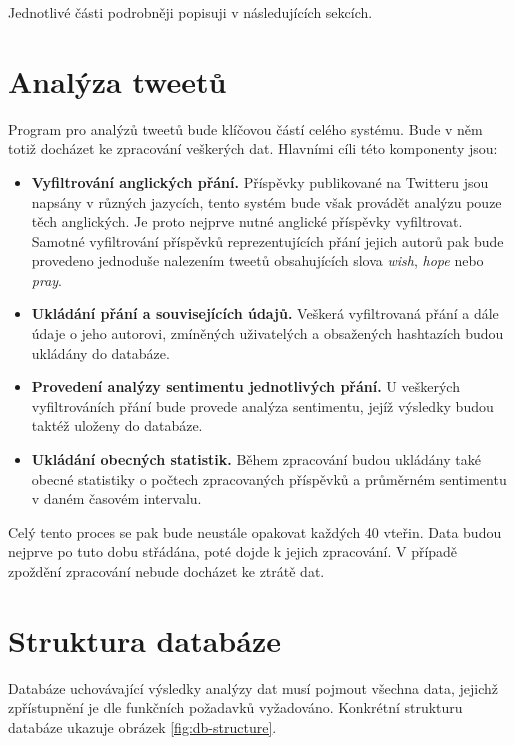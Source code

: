 \documentclass[thesis=B,czech]{FITthesis}[2012/06/26]
\begin{document}
\noindent Jednotlivé části podrobněji popisuji v následujících sekcích. 

\section{Analýza tweetů}
	Program pro analýzů tweetů bude klíčovou částí celého systému. Bude v něm totiž docházet ke zpracování veškerých dat. Hlavními cíli této komponenty jsou:
	
\begin{itemize}
\item \textbf{Vyfiltrování anglických přání.} Příspěvky publikované na Twitteru jsou napsány v různých jazycích, tento systém bude však provádět analýzu pouze těch anglických. Je proto nejprve nutné anglické příspěvky vyfiltrovat. Samotné vyfiltrování příspěvků reprezentujících přání jejich autorů pak bude provedeno jednoduše nalezením tweetů obsahujících slova \textit{wish}, \textit{hope} nebo \textit{pray}. 
\item \textbf{Ukládání přání a souvisejících údajů.} Veškerá vyfiltrovaná přání a dále údaje o jeho autorovi, zmíněných uživatelých a obsažených hashtazích budou ukládány do databáze. 
\item \textbf{Provedení analýzy sentimentu jednotlivých přání.} U veškerých vyfiltrováních přání bude provede analýza sentimentu, jejíž výsledky budou taktéž uloženy do databáze. 
\item \textbf{Ukládání obecných statistik.} Během zpracování budou ukládány také obecné statistiky o počtech zpracovaných příspěvků a průměrném sentimentu v daném časovém intervalu. 
\end{itemize}

Celý tento proces se pak bude neustále opakovat každých 40 vteřin. Data budou nejprve po tuto dobu střádána, poté dojde k jejich zpracování. V případě zpoždění zpracování nebude docházet ke ztrátě dat. 

\section{Struktura databáze}
Databáze uchovávající výsledky analýzy dat musí pojmout všechna data, jejichž zpřístupnění je dle funkčních požadavků vyžadováno. Konkrétní strukturu databáze ukazuje obrázek \ref{fig:db-structure}. 
\end{document}
